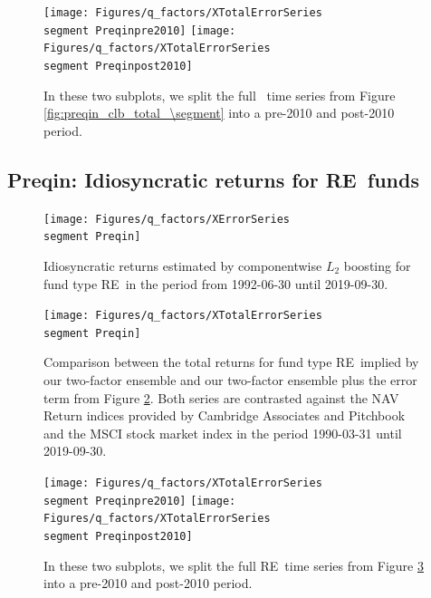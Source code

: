 \begin{figure}[H]
	\centering
	\texttt{[image: Figures/q\_factors/XTotalErrorSeries\\segment Preqinpre2010]}
	\texttt{[image: Figures/q\_factors/XTotalErrorSeries\\segment Preqinpost2010]}
	\caption{
		In these two subplots, we split the full \segment \ time series from Figure \ref{fig:preqin_clb_total_\segment} into a pre-2010 and post-2010 period.
	}
	\label{fig:preqin_clb_pre_post_2010_\segment}
\end{figure}



\renewcommand{\segment}{RE}

\subsection{Preqin: Idiosyncratic returns for \segment \ funds}
\label{sec:preqin_errors_\segment}

\begin{figure}[H]
	\centering
	\texttt{[image: Figures/q\_factors/XErrorSeries\\segment Preqin]}
	\caption{Idiosyncratic returns estimated by componentwise $L_2$ boosting for fund type \segment \ in the period from 1992-06-30 until 2019-09-30.}
	\label{fig:preqin_clb_idio_\segment}
\end{figure}

\begin{figure}[H]
	\centering
	\texttt{[image: Figures/q\_factors/XTotalErrorSeries\\segment Preqin]}
	\caption{
		Comparison between the total returns for fund type \segment \ implied by our two-factor ensemble and our two-factor ensemble plus the error term from Figure \ref{fig:preqin_clb_idio_\segment}.
		Both series are contrasted against the NAV Return indices provided by Cambridge Associates and Pitchbook and the MSCI stock market index in the period 1990-03-31 until 2019-09-30.
	}
	\label{fig:preqin_clb_total_\segment}
\end{figure}

\begin{figure}[H]
	\centering
	\texttt{[image: Figures/q\_factors/XTotalErrorSeries\\segment Preqinpre2010]}
	\texttt{[image: Figures/q\_factors/XTotalErrorSeries\\segment Preqinpost2010]}
	\caption{
		In these two subplots, we split the full \segment \ time series from Figure \ref{fig:preqin_clb_total_\segment} into a pre-2010 and post-2010 period.
	}
	\label{fig:preqin_clb_pre_post_2010_\segment}
\end{figure}

